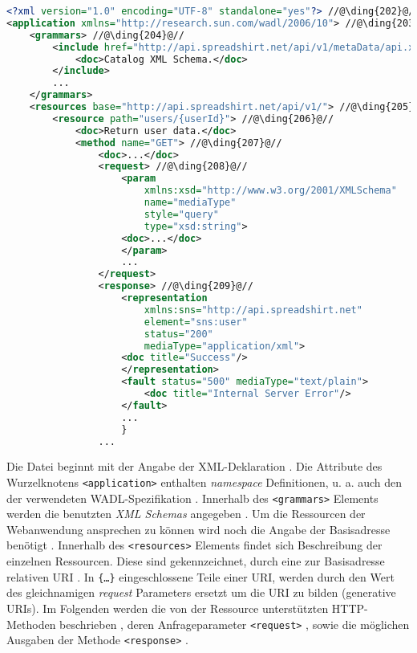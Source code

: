 \begin{lstlisting}[language=XML, caption={Beispielaufbau einer WADL-Datei anhand der Spreadshirt-API Beschreibung}, label=lst:wadlstructure, name=wadlstructure]
<?xml version="1.0" encoding="UTF-8" standalone="yes"?> //@\ding{202}@//
<application xmlns="http://research.sun.com/wadl/2006/10"> //@\ding{203}@//
    <grammars> //@\ding{204}@//
        <include href="http://api.spreadshirt.net/api/v1/metaData/api.xsd">
            <doc>Catalog XML Schema.</doc>
        </include>
        ...
    </grammars>
    <resources base="http://api.spreadshirt.net/api/v1/"> //@\ding{205}@//
        <resource path="users/{userId}"> //@\ding{206}@//
            <doc>Return user data.</doc>
            <method name="GET"> //@\ding{207}@//
                <doc>...</doc>
                <request> //@\ding{208}@//
                    <param 
                        xmlns:xsd="http://www.w3.org/2001/XMLSchema" 
                        name="mediaType" 
                        style="query" 
                        type="xsd:string">
                    <doc>...</doc>
                    </param>
                    ...
                </request>
                <response> //@\ding{209}@//
                    <representation 
                        xmlns:sns="http://api.spreadshirt.net"
                        element="sns:user" 
                        status="200" 
                        mediaType="application/xml">
                    <doc title="Success"/>
                    </representation>
                    <fault status="500" mediaType="text/plain">
                        <doc title="Internal Server Error"/>
                    </fault>
                    ...
                    }
                ...
\end{lstlisting}

Die Datei beginnt mit der Angabe der XML-Deklaration .
Die Attribute des Wurzelknotens \texttt{<application>} enthalten \emph{namespace} Definitionen, u. a. auch den der verwendeten WADL-Spezifikation .
Innerhalb des \texttt{<grammars>} Elements werden die benutzten \emph{XML Schemas} angegeben . 
Um die Ressourcen der Webanwendung ansprechen zu können wird noch die Angabe der Basisadresse benötigt . 
Innerhalb des \texttt{<resources>} Elements findet sich Beschreibung der einzelnen Ressourcen. Diese sind gekennzeichnet, durch eine zur Basisadresse relativen \gls{URI} . In \texttt{\{\ldots\}} eingeschlossene Teile einer \gls{URI}, werden durch den Wert des gleichnamigen \emph{request} Parameters ersetzt um die URI zu bilden (generative URIs).
Im Folgenden werden die von der Ressource unterstützten HTTP-Methoden beschrieben , deren Anfrageparameter \texttt{<request>} , sowie die möglichen Ausgaben der Methode \texttt{<response>} .

